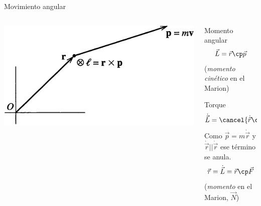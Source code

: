 \documentclass[serif]{beamer}
\begin{document}
\begin{frame}{Movimiento angular}
\begin{columns}[c]
	\begin{column}{0.35\textwidth}
		\begin{block}{}
			\includegraphics[width=\textwidth]{taylor3_5}
		\end{block}
	\end{column}
  \begin{column}{0.6\textwidth}
		\begin{block}{Momento angular}
		\[
			\vec{L}=  \vec{r} \cp \vec{p}
		\]
		(\emph{momento cinético} en el Marion)
		\end{block}
		\pause
		\begin{block}{Torque}
		\[
			\dot{\vec{L}} = \cancel{ \dot{\vec{r}} \cp \vec{p}} + \vec{r} \cp \dot{\vec{p}}
		\]
		Como \(\vec{p}= m \dot{\vec{r}}\) y \(\dot{\vec{r}} || \dot{\vec{r}}\) ese término se anula.
		\[
			\vec{\tau} = \dot{\vec{L}}= \vec{r} \cp \vec{F}
		\]
		(\emph{momento} en el Marion, \(\vec{N}\))
		\end{block}
	\end{column}
\end{columns}
\end{frame}
\end{document}
